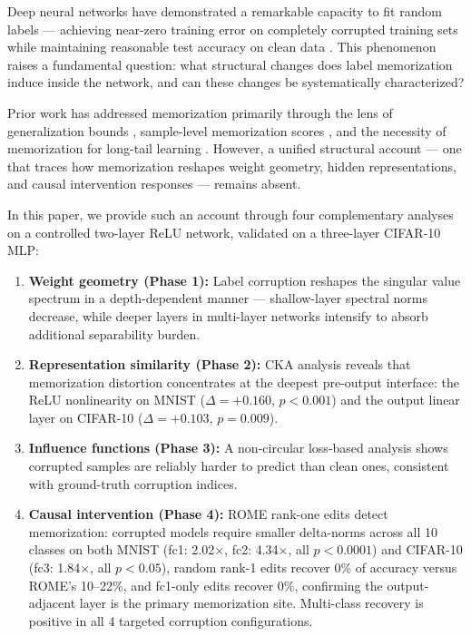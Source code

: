 \documentclass{article}
\begin{document}
Deep neural networks have demonstrated a remarkable capacity to fit random labels — achieving near-zero training error on completely corrupted training sets while maintaining reasonable test accuracy on clean data \cite{zhang2017understanding}. This phenomenon raises a fundamental question: what structural changes does label memorization induce inside the network, and can these changes be systematically characterized?

Prior work has addressed memorization primarily through the lens of generalization bounds \cite{neyshabur2017exploring, arora2018stronger}, sample-level memorization scores \cite{feldman2020what, carlini2022quantifying}, and the necessity of memorization for long-tail learning \cite{feldman2020does}. However, a unified structural account — one that traces how memorization reshapes weight geometry, hidden representations, and causal intervention responses — remains absent.

In this paper, we provide such an account through four complementary analyses on a controlled two-layer ReLU network, validated on a three-layer CIFAR-10 MLP:

\begin{enumerate}[leftmargin=*]
  \item \textbf{Weight geometry (Phase 1):} Label corruption reshapes the singular value spectrum in a depth-dependent manner — shallow-layer spectral norms decrease, while deeper layers in multi-layer networks intensify to absorb additional separability burden.
  \item \textbf{Representation similarity (Phase 2):} CKA analysis reveals that memorization distortion concentrates at the deepest pre-output interface: the ReLU nonlinearity on MNIST ($\Delta = +0.160$, $p < 0.001$) and the output linear layer on CIFAR-10 ($\Delta = +0.103$, $p = 0.009$).
  \item \textbf{Influence functions (Phase 3):} A non-circular loss-based analysis shows corrupted samples are reliably harder to predict than clean ones, consistent with ground-truth corruption indices.
  \item \textbf{Causal intervention (Phase 4):} ROME rank-one edits detect memorization: corrupted models require smaller delta-norms across all 10 classes on both MNIST (fc1: 2.02$\times$, fc2: 4.34$\times$, all $p < 0.0001$) and CIFAR-10 (fc3: 1.84$\times$, all $p < 0.05$), random rank-1 edits recover 0\% of accuracy versus ROME's 10--22\%, and fc1-only edits recover 0\%, confirming the output-adjacent layer is the primary memorization site. Multi-class recovery is positive in all 4 targeted corruption configurations.
\end{enumerate}
\end{document}
